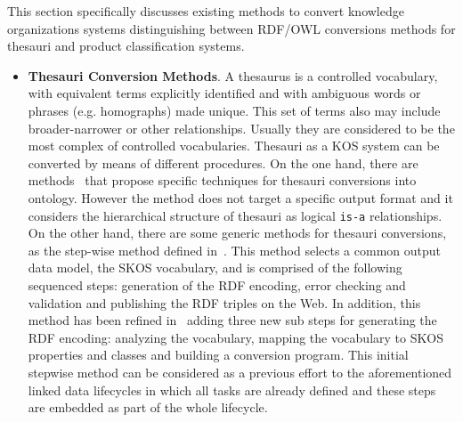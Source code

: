 This section specifically discusses existing methods to convert knowledge organizations systems distinguishing between RDF/OWL 
conversions methods for thesauri and product classification systems.

\begin{itemize}
 \item \textbf{Thesauri Conversion Methods}. A thesaurus is a controlled vocabulary, with equivalent terms explicitly 
 identified and with ambiguous words or phrases (e.g. homographs) made unique. This set of terms also may include broader-narrower 
 or other relationships. Usually they are considered to be the most complex of controlled vocabularies. Thesauri as a KOS 
 system can be converted by means of different procedures. On the one hand, there are methods~\cite{DBLP:conf/jcdl/Soergel05} that propose specific 
 techniques for thesauri conversions into ontology. However the method does not target a specific output format and it considers the 
 hierarchical structure of thesauri as logical \texttt{is-a} relationships. On the other hand, there are some generic methods 
 for thesauri conversions, as the step-wise method defined in~\cite{DBLP:conf/esws/AssemMMS06}. This method selects a common output data model, the 
 SKOS vocabulary, and is comprised of the following sequenced steps: generation of the RDF encoding, error checking and validation 
 and publishing the RDF triples on the Web. In addition, this method has been refined in~\cite{siedl2008} adding three new sub steps 
 for generating the RDF encoding: analyzing the vocabulary, mapping the vocabulary to SKOS properties and classes and building a conversion program. 
 This initial stepwise method can be considered as a previous effort to the aforementioned linked data lifecycles in which all tasks are already defined and these
 steps are embedded as part of the whole lifecycle.
 

\end{itemize}
